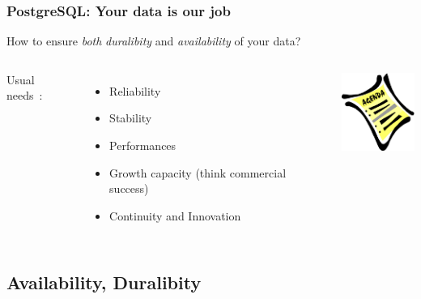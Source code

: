 \documentclass[english]{beamer}
\begin{document}
\begin{frame}[fragile]
  \frametitle{PostgreSQL: Your data is our job}

  \begin{center}
    How to ensure \emph{both} \textit{duralibity} and \textit{availability}
    of your data?
  \end{center}
  \linebreak

\begin{columns}[c]

  Usual needs :

  \begin{itemize}
   \item<2-> Reliability
   \item<2-> Stability
   \item<2-> Performances
   \item<3-> Growth capacity (think commercial success)
   \item<3-> Continuity and Innovation
  \end{itemize}  

\begin{center}
  \includegraphics[height=7em]{agenda.jpg}
\end{center}
\end{columns}
\end{frame}

\subsection{Availability, Duralibity}
\frame{\tableofcontents[currentsubsection]}
\end{document}
